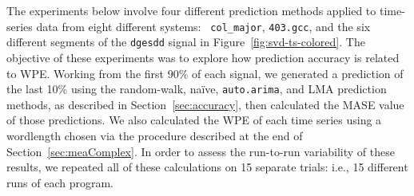 \documentclass[%
pre,
reprint,
superscriptaddress,
showpacs,
nofootinbib,
nobibnotes,
 amsmath,amssymb,
 aps,
]{revtex4-1}
\newcommand{\arima}{{\tt auto.arima}\xspace}
\newcommand{\naive}{na\"ive}
\begin{document}




The experiments below involve four different prediction methods
applied to time-series data from eight different systems: {\tt
  col\_major}, {\tt 403.gcc}, and the six different segments of the
{\tt dgesdd} signal in Figure~\ref{fig:svd-ts-colored}.  The objective
of these experiments was to explore how prediction accuracy is related
to WPE.
%
%
Working from the first 90\% of each signal, we generated a prediction
of the last 10\% using the random-walk, \naive, \arima, and LMA
prediction methods, as described in Section~\ref{sec:accuracy}, then
calculated the MASE value of those predictions.  We also calculated
the WPE of each time series using a wordlength chosen via the
procedure described at the end of Section~\ref{sec:meaComplex}.  In
order to assess the run-to-run variability of these results, we
repeated all of these calculations on 15 separate trials: i.e., 15
different runs of each program.

\end{document}

